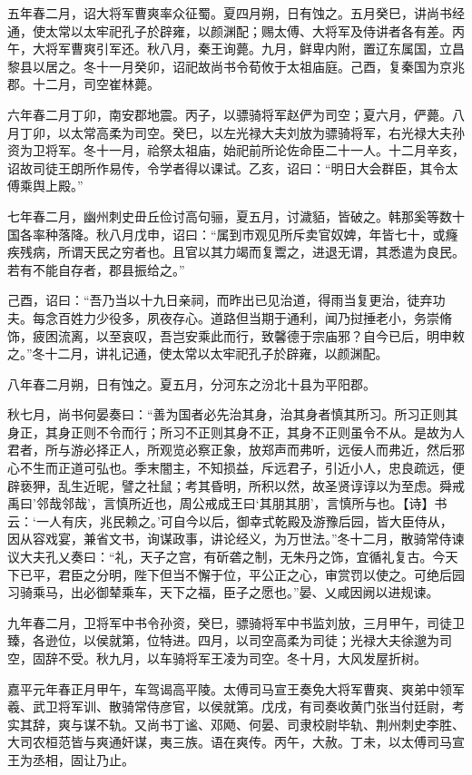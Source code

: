 \documentclass[12pt,UTF8]{ctexbook}
\begin{document}
五年春二月，诏大将军曹爽率众征蜀。夏四月朔，日有蚀之。五月癸巳，讲尚书经通，使太常以太牢祀孔子於辟雍，以颜渊配；赐太傅、大将军及侍讲者各有差。丙午，大将军曹爽引军还。秋八月，秦王询薨。九月，鲜卑内附，置辽东属国，立昌黎县以居之。冬十一月癸卯，诏祀故尚书令荀攸于太祖庙庭。己酉，复秦国为京兆郡。十二月，司空崔林薨。

六年春二月丁卯，南安郡地震。丙子，以骠骑将军赵俨为司空；夏六月，俨薨。八月丁卯，以太常高柔为司空。癸巳，以左光禄大夫刘放为骠骑将军，右光禄大夫孙资为卫将军。冬十一月，祫祭太祖庙，始祀前所论佐命臣二十一人。十二月辛亥，诏故司徒王朗所作易传，令学者得以课试。乙亥，诏曰：“明日大会群臣，其令太傅乘舆上殿。”

七年春二月，幽州刺史毌丘俭讨高句骊，夏五月，讨濊貊，皆破之。韩那奚等数十国各率种落降。秋八月戊申，诏曰：“属到巿观见所斥卖官奴婢，年皆七十，或癃疾残病，所谓天民之穷者也。且官以其力竭而复鬻之，进退无谓，其悉遣为良民。若有不能自存者，郡县振给之。”

己酉，诏曰：“吾乃当以十九日亲祠，而昨出已见治道，得雨当复更治，徒弃功夫。每念百姓力少役多，夙夜存心。道路但当期于通利，闻乃挝捶老小，务崇脩饰，疲困流离，以至哀叹，吾岂安乘此而行，致馨德于宗庙邪？自今已后，明申敕之。”冬十二月，讲礼记通，使太常以太牢祀孔子於辟雍，以颜渊配。

八年春二月朔，日有蚀之。夏五月，分河东之汾北十县为平阳郡。

秋七月，尚书何晏奏曰：“善为国者必先治其身，治其身者慎其所习。所习正则其身正，其身正则不令而行；所习不正则其身不正，其身不正则虽令不从。是故为人君者，所与游必择正人，所观览必察正象，放郑声而弗听，远佞人而弗近，然后邪心不生而正道可弘也。季末闇主，不知损益，斥远君子，引近小人，忠良疏远，便辟亵狎，乱生近昵，譬之社鼠；考其昏明，所积以然，故圣贤谆谆以为至虑。舜戒禹曰'邻哉邻哉'，言慎所近也，周公戒成王曰‘其朋其朋’，言慎所与也。【诗】书云：‘一人有庆，兆民赖之。’可自今以后，御幸式乾殿及游豫后园，皆大臣侍从，因从容戏宴，兼省文书，询谋政事，讲论经义，为万世法。”冬十二月，散骑常侍谏议大夫孔乂奏曰：“礼，天子之宫，有斫砻之制，无朱丹之饰，宜循礼复古。今天下已平，君臣之分明，陛下但当不懈于位，平公正之心，审赏罚以使之。可绝后园习骑乘马，出必御辇乘车，天下之福，臣子之愿也。”晏、乂咸因阙以进规谏。

九年春二月，卫将军中书令孙资，癸巳，骠骑将军中书监刘放，三月甲午，司徒卫臻，各逊位，以侯就第，位特进。四月，以司空高柔为司徒；光禄大夫徐邈为司空，固辞不受。秋九月，以车骑将军王凌为司空。冬十月，大风发屋折树。

嘉平元年春正月甲午，车驾谒高平陵。太傅司马宣王奏免大将军曹爽、爽弟中领军羲、武卫将军训、散骑常侍彦官，以侯就第。戊戌，有司奏收黄门张当付廷尉，考实其辞，爽与谋不轨。又尚书丁谧、邓飏、何晏、司隶校尉毕轨、荆州刺史李胜、大司农桓范皆与爽通奸谋，夷三族。语在爽传。丙午，大赦。丁未，以太傅司马宣王为丞相，固让乃止。
\end{document}
